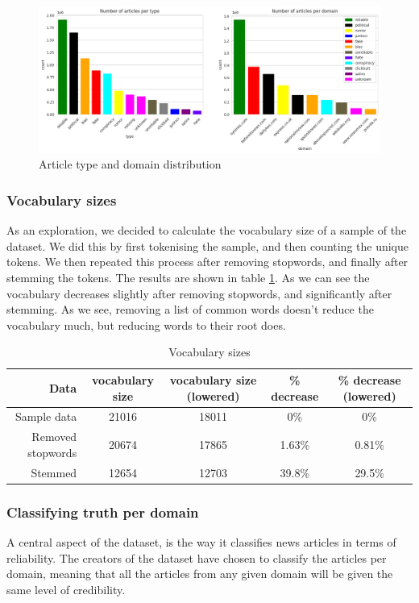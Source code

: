\begin{figure}[htpb]
  \centering
  \includegraphics[width=1\textwidth]{combdist}
  \caption{Article type and domain distribution}
  \label{fig:combdist}
\end{figure}
\subsubsection{Vocabulary sizes}
As an exploration, we decided to calculate the vocabulary size of a sample of the dataset. We did this by first
tokenising the sample, and then counting the
unique tokens. We then repeated this process after removing stopwords, and finally after stemming the tokens. The
results are shown in table \ref{tab:vocab_sizes}. As we can see the vocabulary decreases slightly after removing
stopwords, and significantly after stemming. As we see, removing a list of common words doesn't reduce the vocabulary
much, but reducing words to their root does.

\begin{table}[h]
    \centering
    \begin{tabular}{r| c | c | c| c}
      Data& vocabulary size & vocabulary size (lowered) & \% decrease & \% decrease (lowered)\\
        \hline
      Sample data& 21016 & 18011 & 0\% & 0\% \\
    \hline
      Removed stopwords & 20674 & 17865 & 1.63\% & 0.81\% \\
    \hline
      Stemmed & 12654 & 12703 & 39.8\% & 29.5\%
    \end{tabular}
    \caption{Vocabulary sizes}
    \label{tab:vocab_sizes}
\end{table}



\subsubsection{Classifying truth per domain}\label{sec:truth_pr_domain}
A central aspect of the dataset, is the way it classifies news articles in terms of reliability. The creators of the
dataset have chosen to classify the articles per domain, meaning that all the articles from any given domain will be
given the same level of credibility.


